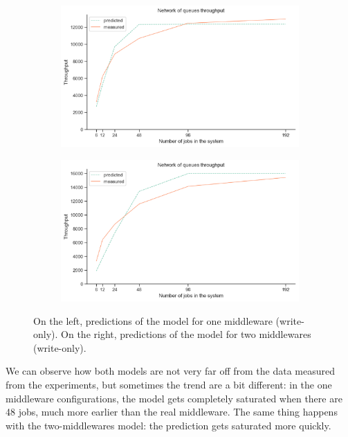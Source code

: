 \documentclass[11pt,a4paper]{article}
\begin{document}
\begin{figure}[H]
	\begin{subfigure}[b]{0.5\linewidth}
		\includegraphics[width=\linewidth]{images/network/one_middleware.pdf}
	\end{subfigure}
	\begin{subfigure}[b]{0.5\linewidth}
		\includegraphics[width=\linewidth]{images/network/two_middlewares.pdf}
	\end{subfigure}
	\caption{On the left, predictions of the model for one middleware (write-only). 
	On the right, predictions of the model for two middlewares (write-only).}

	\label{fig:sharded}
\end{figure}

We can observe how both models are not very far off from the data measured from the experiments, 
but sometimes the trend are a bit different: in the one middleware configurations, the model 
gets completely saturated when there are 48 jobs, much more earlier than the real middleware.
The same thing happens with the two-middlewares model: the prediction gets saturated more quickly.
\end{document}
